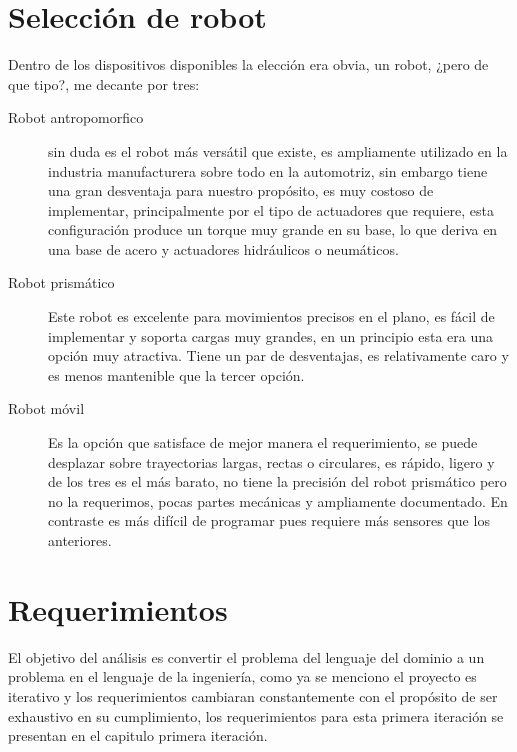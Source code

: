 \section{Selección de robot}
Dentro de los dispositivos disponibles la elección era obvia, un robot, ¿pero  de
que tipo?, me decante por tres:
\begin{description}
	\item[Robot antropomorfico] sin duda es el robot más versátil que existe,
		es ampliamente utilizado en la industria manufacturera sobre todo
		en la automotriz, sin embargo tiene una gran desventaja para 
		nuestro propósito, es muy costoso de implementar, principalmente
		por el tipo de actuadores que requiere, esta configuración produce 
		un torque muy grande en su base, lo que deriva en una base de 
		acero y actuadores hidráulicos o neumáticos.
	\item[Robot prismático] Este robot es excelente para movimientos precisos 
		en el plano, es fácil de implementar y soporta cargas muy grandes,
		en un principio esta era una opción muy atractiva. Tiene un par 
		de desventajas, es relativamente caro y es menos mantenible que 
		la tercer opción.
	\item[Robot móvil] Es la opción que satisface de mejor manera el 
		requerimiento, se puede desplazar sobre trayectorias largas, 
		rectas o circulares, es rápido, ligero y de los tres es el más
		barato, no tiene la precisión del robot prismático pero no la 
		requerimos, pocas partes mecánicas y ampliamente documentado. 
		En contraste es más difícil de programar pues requiere más 
		sensores que los anteriores.
\end{description}

\section{Requerimientos}
El objetivo del análisis es convertir el problema del lenguaje del dominio a un
problema en el lenguaje de la ingeniería, como ya se menciono el proyecto es 
iterativo y los requerimientos cambiaran constantemente con el propósito de 
ser exhaustivo en su cumplimiento, los requerimientos para esta primera iteración
se presentan en el capitulo primera iteración.
